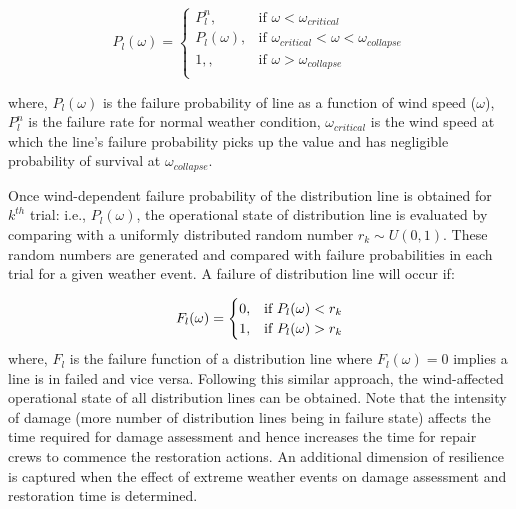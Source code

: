 \documentclass[12pt]{article}
\begin{document}
\begin{small}
\vspace{-0.1 cm}
  \[
    P_l(\omega)= 
    \begin{cases}
   P_l^n,& \text{if } \omega< \omega_{critical}\\
    P_l(\omega),& \text{if } \omega_{critical}<\omega< \omega_{collapse}\\
    1, ,& \text{if } \omega>\omega_{collapse}\\
    \end{cases}
    \]
\end{small}
\vspace{-0.1 cm}

\noindent where, $P_l(\omega)$ is the failure probability of line as a function of wind speed ($\omega$), $P_l^n$ is the failure rate for normal weather condition, $\omega_{critical}$ is the wind speed at which the line's failure probability picks up the value and has negligible probability of survival at $\omega_{collapse}$. 

Once wind-dependent failure probability of the distribution line is obtained for $k^{th}$ trial: i.e., $P_l(\omega)$, the operational state of distribution line is evaluated by comparing with a uniformly distributed random number $r_k \sim U (0,1)$. These random numbers are generated and compared with failure probabilities in each trial for a given weather event. A failure of distribution line will occur if:

\begin{equation}\label{eq:5}
\vspace{-0.1 cm}
    F_l(\omega)= 
    \begin{cases}
    0,& \text{if } P_l(\omega)<r_k\\
    1,& \text{if } P_l(\omega)>r_k
    \end{cases}
\end{equation}
where, $F_l$ is the failure function of a distribution line where $F_l(\omega)=0$ implies a line is in failed and vice versa. Following this similar approach, the wind-affected operational state of all distribution lines can be obtained. Note that the intensity of damage (more number of distribution lines being in failure state) affects the time required for damage assessment and hence increases the time for repair crews to commence the restoration actions. An additional dimension of resilience is captured when the effect of extreme weather events on damage assessment and restoration time is determined.  
 
\end{document}
